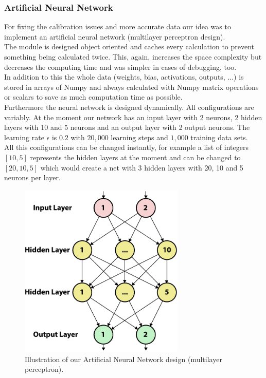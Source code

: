 \documentclass[lnicst,a4paper]{svmultln}
\begin{document}
\subsubsection{Artificial Neural Network}
For fixing the calibration issues and more accurate data our idea was to implement an artificial neural network (multilayer perceptron design).
\\
The module is designed object oriented and caches every calculation to prevent something being calculated twice. This, again, increases the space complexity but decreases the computing time and was simpler in cases of debugging, too.
\\
In addition to this the whole data (weights, bias, activations, outputs, ...) is stored in arrays of Numpy and always calculated with Numpy matrix operations or scalars to save as much computation time as possible.
\\
Furthermore the neural network is designed dynamically. All configurations are variably. At the moment our network has an input layer with 2 neurons, 2 hidden layers with 10 and 5 neurons and an output layer with 2 output neurons. The learning rate $\epsilon$ is $0.2$ with $20,000$ learning steps and $1,000$ training data sets.
\\
All this configurations can be changed instantly, for example a list of integers $[10, 5]$ represents the hidden layers at the moment and can be changed to $[20, 10, 5]$ which would create a net with 3 hidden layers with 20, 10 and 5 neurons per layer.
\\
\begin{figure}
 	\centerline{\includegraphics[width=0.7\textwidth]{neuralnet1.pdf}}
	{\caption{Illustration of our Artificial Neural Network design (multilayer perceptron).}\label{fig:ann_illustration1}}
\end{figure}
\end{document}
